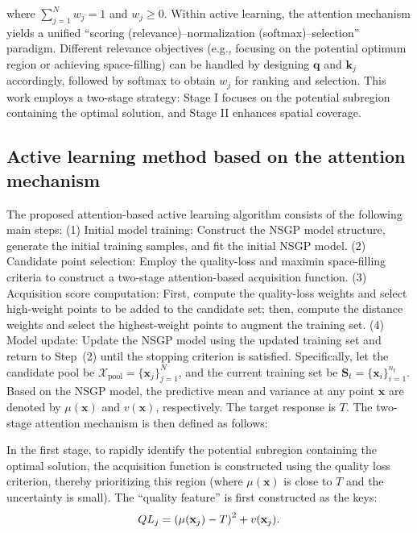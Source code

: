 \documentclass[]{interact}
\theoremstyle{plain}%
\theoremstyle{definition}
\theoremstyle{remark}
\begin{document}
where $\sum_{j=1}^{N}w_j=1$ and $w_j\ge 0$.
Within active learning, the attention mechanism yields a unified “scoring (relevance)–normalization (softmax)–selection” paradigm. Different relevance objectives (e.g., focusing on the potential optimum region or achieving space-filling) can be handled by designing $\mathbf{q}$ and $\mathbf{k}_j$ accordingly, followed by softmax to obtain $w_j$ for ranking and selection. This work employs a two-stage strategy: Stage I focuses on the potential subregion containing the optimal solution, and Stage II enhances spatial coverage.

\subsection{Active learning method based on the attention mechanism}
The proposed attention-based active learning algorithm consists of the following main steps: (1) Initial model training: Construct the NSGP model structure, generate the initial training samples, and fit the initial NSGP model. (2) Candidate point selection: Employ the quality-loss and maximin space-filling criteria to construct a two-stage attention-based acquisition function. (3) Acquisition score computation: First, compute the quality-loss weights and select high-weight points to be added to the candidate set; then, compute the distance weights and select the highest-weight points to augment the training set. (4) Model update: Update the NSGP model using the updated training set and return to Step~(2) until the stopping criterion is satisfied. Specifically, let the candidate pool be $\mathcal{X}_{\mathrm{pool}} = \{\mathbf{x}_{j}\}_{j=1}^{N}$, and the current training set be $\mathbf{S}_{t} = \{\mathbf{x}_{i}\}_{i=1}^{n_{t}}$. Based on the NSGP model, the predictive mean and variance at any point $\mathbf{x}$ are denoted by $\mu(\mathbf{x})$ and $v(\mathbf{x})$, respectively. The target response is $T$. The two-stage attention mechanism is then defined as follows:

In the first stage, to rapidly identify the potential subregion containing the optimal solution, the acquisition function is constructed using the quality loss criterion, thereby prioritizing this region (where $\mu(\mathbf{x})$ is close to $T$ and the uncertainty is small). The ``quality feature'' is first constructed as the keys:
\begin{equation}
	Q{L_j} = {\left( {\mu ({{\bf{x}}_j}) - T} \right)^2} + v({{\bf{x}}_j}).
\end{equation}
\end{document}
